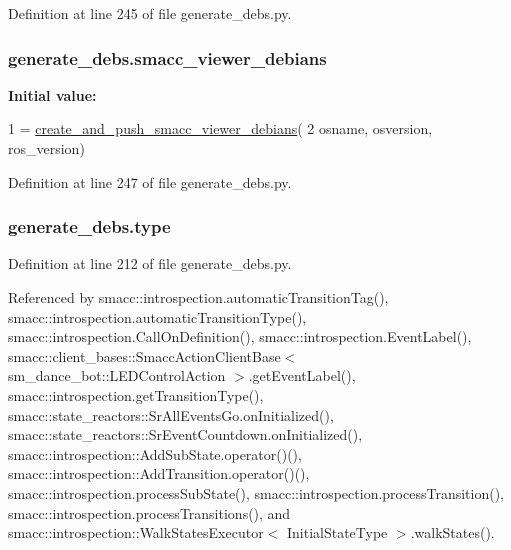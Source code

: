 Definition at line 245 of file generate\+\_\+debs.\+py.

\subsubsection[{\texorpdfstring{smacc\+\_\+viewer\+\_\+debians}{smacc_viewer_debians}}]{\setlength{\rightskip}{0pt plus 5cm}generate\+\_\+debs.\+smacc\+\_\+viewer\+\_\+debians}\hypertarget{namespacegenerate__debs_a545b249defac1bf82a09872513263f61}{}\label{namespacegenerate__debs_a545b249defac1bf82a09872513263f61}
{\bfseries Initial value\+:}
\begin{DoxyCode}
1 = \hyperlink{namespacegenerate__debs_a9a6167ed98fbdc7b1e1c56da5652cf19}{create\_and\_push\_smacc\_viewer\_debians}(
2         osname, osversion, ros\_version)
\end{DoxyCode}


Definition at line 247 of file generate\+\_\+debs.\+py.

\subsubsection[{\texorpdfstring{type}{type}}]{\setlength{\rightskip}{0pt plus 5cm}generate\+\_\+debs.\+type}\hypertarget{namespacegenerate__debs_a50bc9a7ecac9584553e089a448bcde58}{}\label{namespacegenerate__debs_a50bc9a7ecac9584553e089a448bcde58}


Definition at line 212 of file generate\+\_\+debs.\+py.



Referenced by smacc\+::introspection.\+automatic\+Transition\+Tag(), smacc\+::introspection.\+automatic\+Transition\+Type(), smacc\+::introspection.\+Call\+On\+Definition(), smacc\+::introspection.\+Event\+Label(), smacc\+::client\+\_\+bases\+::\+Smacc\+Action\+Client\+Base$<$ sm\+\_\+dance\+\_\+bot\+::\+L\+E\+D\+Control\+Action $>$.\+get\+Event\+Label(), smacc\+::introspection.\+get\+Transition\+Type(), smacc\+::state\+\_\+reactors\+::\+Sr\+All\+Events\+Go.\+on\+Initialized(), smacc\+::state\+\_\+reactors\+::\+Sr\+Event\+Countdown.\+on\+Initialized(), smacc\+::introspection\+::\+Add\+Sub\+State.\+operator()(), smacc\+::introspection\+::\+Add\+Transition.\+operator()(), smacc\+::introspection.\+process\+Sub\+State(), smacc\+::introspection.\+process\+Transition(), smacc\+::introspection.\+process\+Transitions(), and smacc\+::introspection\+::\+Walk\+States\+Executor$<$ Initial\+State\+Type $>$.\+walk\+States().

